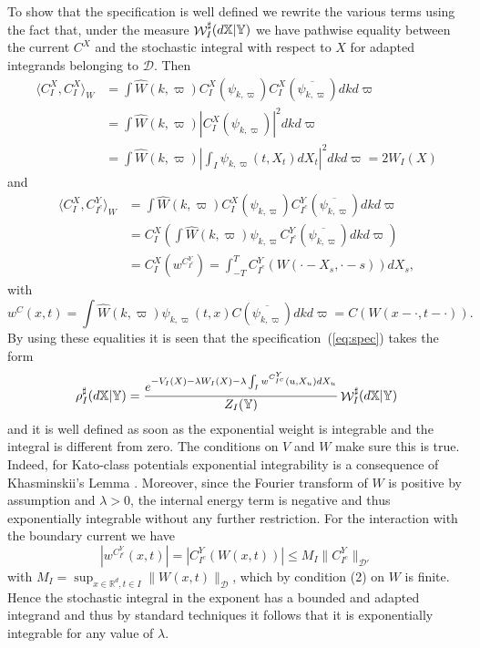 \documentclass[a4paper,11pt]{article}
\newcommand{\wW}{\widehat W}
\newcommand{\R}{\mathbb{R}}
\newcommand {\D}  {\ensuremath {\mathcal{D}}}
\newcommand{\W}{\mathop{\mathrm{{\cal W}}}\nolimits}
\begin{document}
To show that the specification is well defined we rewrite the 
various terms using the fact that, under the measure 
$\W^\sharp_I(d\mathbb{X}|\mathbb{Y})$ we have pathwise 
equality between the current $C^X$ and the stochastic integral 
with respect to $X$ for adapted integrands belonging to $\D$. 
Then
\begin{equation*}
  \begin{split}
\langle C_I^X, C_I^X \rangle_W  & = \int \wW(k,\varpi)
C_I^X(\psi_{k,\varpi}) C_I^X(\overline{\psi_{k,\varpi}})
dk d\varpi
   \\ &   = \int \wW(k,\varpi) |C_I^X(\psi_{k,\varpi})|^2
             dk d\varpi 
   \\ &   = \int \wW(k,\varpi)
\left|\int_I \psi_{k,\varpi}(t,X_t) dX_t \right|^2 
dk d\varpi = 2 W_I(X)
  \end{split}
\end{equation*}
and
\begin{equation*}
  \begin{split}
\langle C_I^X, C_{I^c}^Y \rangle_W & = 
\int \wW(k,\varpi) C_I^X(\psi_{k,\varpi}) C_{I^c}^Y
(\overline{\psi_{k,\varpi}}) dk d\varpi 
\\
 & =
C_I^X\left( \int \wW(k,\varpi)\psi_{k,\varpi} 
C_{I^c}^Y(\overline{\psi_{k,\varpi}}) dk d\varpi \right)
\\
 & =
C_I^X\left( w^{C_{I^c}^Y}\right) = \int_{-T}^{T}
C_{I^c}^Y(W(\cdot - X_s,\cdot - s)) dX_s,
  \end{split}
\end{equation*}
with
$$
w^C(x,t) = \int \wW(k,\varpi)\psi_{k,\varpi}(t,x)
C(\overline{\psi_{k,\varpi}}) dk d\varpi  = 
C(W(x-\cdot,t-\cdot)).
$$
By using these equalities it is seen that the 
specification~(\ref{eq:spec}) takes the form
\begin{equation}
\label{eq:spec2}
\rho^\sharp_I(d\mathbb{X}|\mathbb{Y}) =
\frac{e^{-V_I(X)-\lambda W_I(X)-
\lambda \int_I w^{C_{I^c}^Y}(u,X_u)dX_u}}{Z_I(\mathbb{Y})} 
\W^\sharp_I(d\mathbb{X} | \mathbb{Y})  
\end{equation}
and it is well defined as soon as the exponential weight is integrable
and the integral is different from zero. The conditions on $V$ and $W$ 
make sure this is true. Indeed, for Kato-class potentials exponential 
integrability is a consequence of Khasminskii's Lemma \cite{Sim82}. 
Moreover, since the Fourier transform of $W$ is positive by assumption 
and $\lambda >0$, the internal energy term is negative and thus 
exponentially integrable without any further restriction. For the 
interaction with the boundary current we have
$$
|w^{C_{I^c}^Y}(x,t)| = |C_{I^c}^Y(W(x,t))| \le M_I \|C_{I^c}^Y\|_{\D'} 
$$
with $M_I = \sup_{x\in \R^d,t\in I} \|W(x,t)\|_{\D}$, which by
condition (2) on $W$ is finite. Hence the stochastic integral in the 
exponent has a bounded and adapted integrand and thus by standard 
techniques it follows that it is exponentially integrable for any
value of $\lambda$.
\end{document}
